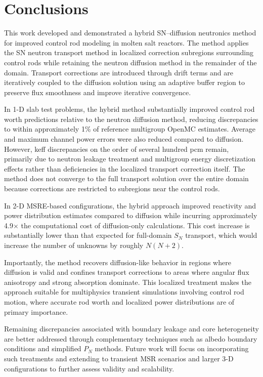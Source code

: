 \section{Conclusions} \label{sec:conclusion}

This work developed and demonstrated a hybrid SN–diffusion neutronics method for improved control
rod modeling in molten salt reactors. The method applies the SN neutron transport method in
localized correction subregions surrounding control rods while retaining the neutron diffusion
method in the remainder of the domain. Transport corrections are introduced through drift
terms and are iteratively coupled to the diffusion solution using an adaptive buffer region to
preserve flux smoothness and improve iterative convergence.

In 1-D slab test problems, the hybrid method substantially improved control rod worth predictions
relative to the neutron diffusion method, reducing discrepancies to within approximately 1\% of
reference multigroup OpenMC estimates. Average and maximum channel power errors were also reduced
compared to diffusion. However, keff discrepancies on the order of several hundred pcm
remain, primarily due to neutron leakage treatment and multigroup energy discretization effects
rather than deficiencies in the localized transport correction itself. The method does not converge
to the full transport solution over the entire domain because corrections are restricted to
subregions near the control rods.

In 2-D MSRE-based configurations, the hybrid approach improved reactivity and power distribution
estimates compared to diffusion while incurring approximately 4.9$\times$ the computational cost of
diffusion-only calculations. This cost increase is substantially lower than that expected for
full-domain $S_N$ transport, which would increase the number of unknowns by roughly
$N\left(N+2\right)$.

Importantly, the method recovers diffusion-like behavior in regions where diffusion is valid and
confines transport corrections to areas where angular flux anisotropy and strong absorption
dominate. This localized treatment makes the approach suitable for multiphysics transient
simulations involving control rod motion, where accurate rod worth and localized power
distributions are of primary importance.

Remaining discrepancies associated with boundary leakage and core heterogeneity are better
addressed through complementary techniques such as albedo boundary conditions and simplified $P_N$
methods. Future work will focus on incorporating such treatments and extending to transient
\gls{MSR} scenarios and larger 3-D configurations to further assess validity and scalability.
